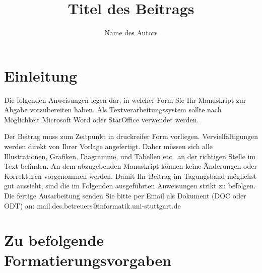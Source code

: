 \documentclass[12pt,paper=a4]{scrartcl}
\begin{document}
	
\title{Titel des Beitrags}
\author{Name des Autors}









\section{Einleitung}
Die folgenden Anweisungen legen dar, in welcher Form Sie Ihr Manuskript zur Abgabe vorzubereiten haben.
Als Textverarbeitungssystem sollte nach Möglichkeit Microsoft Word oder StarOffice verwendet werden.

Der Beitrag muss zum Zeitpunkt in druckreifer Form vorliegen.
Vervielfältigungen werden direkt von Ihrer Vorlage angefertigt.
Daher müssen sich alle Illustrationen, Grafiken, Diagramme, und Tabellen etc.\ an der richtigen Stelle im Text befinden.
An dem abzugebenden Manuskript können keine Änderungen oder Korrekturen vorgenommen werden.
Damit Ihr Beitrag im Tagungsband möglichst gut aussieht, sind die im Folgenden ausgeführten Anweisungen strikt zu befolgen.
Die fertige Ausarbeitung senden Sie bitte per Email als Dokument (DOC oder ODT) an: mail.des.betreuers@informatik.uni-stuttgart.de



\section{Zu befolgende Formatierungsvorgaben}
\end{document}
